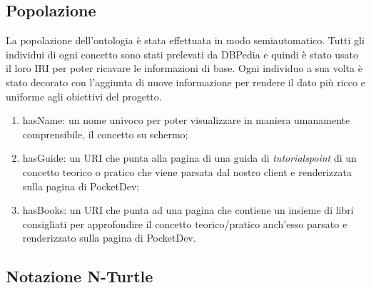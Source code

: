 \subsection{Popolazione}
La popolazione dell'ontologia è stata effettuata in modo semiautomatico. Tutti gli individui di ogni concetto sono stati prelevati da DBPedia e quindi è stato usato il loro IRI per poter ricavare le informazioni di base. Ogni individuo a sua volta è stato decorato con l'aggiunta di nuove informazione per rendere il dato più ricco e uniforme agli obiettivi del progetto. 
\begin{enumerate}
 \item hasName: un nome univoco per poter visualizzare in maniera umanamente comprensibile, il concetto su schermo;
 \item hasGuide: un URI che punta alla pagina di una guida di \textit{tutorialspoint} di un concetto teorico o pratico che viene  parsata dal nostro client e renderizzata sulla pagina di PocketDev;
 \item hasBooks: un URI che punta ad una pagina che contiene un insieme di libri consigliati per approfondire il concetto teorico/pratico anch'esso parsato e renderizzato sulla pagina di PocketDev.
\end{enumerate}
\subsection{Notazione N-Turtle}
